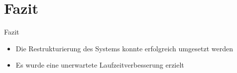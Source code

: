 \section{Fazit}

\begin{frame}{Fazit}
    \vspace{3em}
    \Large
    \begin{itemize}
        \item Die Restrukturierung des Systems konnte erfolgreich umgesetzt werden
        \item Es wurde eine unerwartete Laufzeitverbesserung erzielt
    \end{itemize}
\end{frame}
